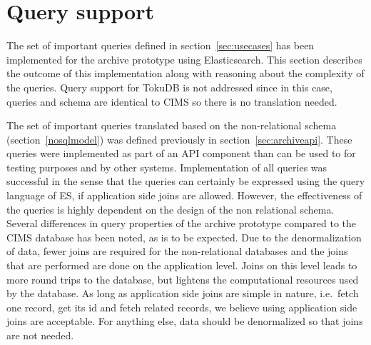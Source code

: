 
\section{Query support}

The set of important queries defined in section~\ref{sec:usecases} has been implemented for the archive prototype using Elasticsearch. This section describes the outcome of this implementation along with reasoning about the complexity of the queries. Query support for TokuDB is not addressed since in this case, queries and schema are identical to CIMS so there is no translation needed.

The set of important queries translated based on the non-relational schema (section~\ref{nosqlmodel}) was defined previously in section~\ref{sec:archiveapi}. These queries were implemented as part of an API component than can be used to for testing purposes and by other systems. Implementation of all queries was successful in the sense that the queries can certainly be expressed using the query language of ES, if application side joins are allowed. However, the effectiveness of the queries is highly dependent on the design of the non relational schema. Several differences in query properties of the archive prototype compared to the CIMS database has been noted, as is to be expected. Due to the denormalization of data, fewer joins are required for the non-relational databases and the joins that are performed are done on the application level. Joins on this level leads to more round trips to the database, but lightens the computational resources used by the database. As long as application side joins are simple in nature, i.e.\ fetch one record, get its id and fetch related records, we believe using application side joins are acceptable. For anything else, data should be denormalized so that joins are not needed.



%

